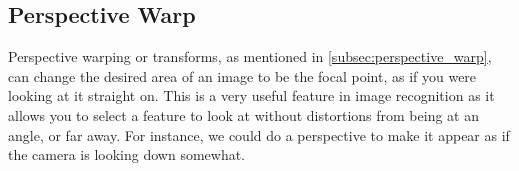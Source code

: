 \subsection{Perspective Warp} \label{subsec:perspective_observations}
Perspective warping or transforms, as mentioned in \autoref{subsec:perspective_warp}, can change the desired area of an image to be the focal point, as if you were looking at it straight on.  This is a very useful feature in image recognition as it allows you to select a feature to look at without distortions from being at an angle, or far away.  For instance, we could do a perspective to make it appear as if the camera is looking down somewhat.

